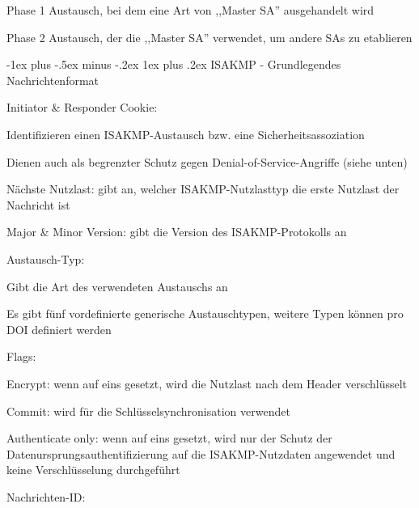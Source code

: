 \documentclass[a4paper]{article}
\makeatletter
\renewcommand{\subsubsection}{\@startsection{subsubsection}{3}{0mm}%
 {-1ex plus -.5ex minus -.2ex}%
 {1ex plus .2ex}%
 {\normalfont\small\bfseries}}
\makeatother
\begin{document}
\begin{multicols}{3}
\begin{itemize*}
            \begin{itemize*}
                  \item Phase 1 Austausch, bei dem eine Art von ,,Master SA'' ausgehandelt wird
                  \item Phase 2 Austausch, der die ,,Master SA'' verwendet, um andere SAs zu etablieren
            \end{itemize*}
      \end{itemize*}


      \subsubsection{ISAKMP - Grundlegendes
            Nachrichtenformat}

      \begin{itemize*}
            \item
            \item
            Initiator \& Responder Cookie:

            \begin{itemize*}
                  \item Identifizieren einen ISAKMP-Austausch bzw. eine Sicherheitsassoziation
                  \item Dienen auch als begrenzter Schutz gegen Denial-of-Service-Angriffe (siehe unten)
            \end{itemize*}
            \item
            Nächste Nutzlast: gibt an, welcher ISAKMP-Nutzlasttyp die erste
            Nutzlast der Nachricht ist
            \item
            Major \& Minor Version: gibt die Version des ISAKMP-Protokolls an
            \item
            Austausch-Typ:

            \begin{itemize*}
                  \item Gibt die Art des verwendeten Austauschs an
                  \item Es gibt fünf vordefinierte generische Austauschtypen, weitere Typen können pro DOI definiert werden
            \end{itemize*}
            \item
            Flags:

            \begin{itemize*}
                  \item Encrypt: wenn auf eins gesetzt, wird die Nutzlast nach dem Header verschlüsselt
                  \item Commit: wird für die Schlüsselsynchronisation verwendet
                  \item Authenticate only: wenn auf eins gesetzt, wird nur der Schutz der Datenursprungsauthentifizierung auf die ISAKMP-Nutzdaten angewendet und keine Verschlüsselung durchgeführt
            \end{itemize*}
            \item
            Nachrichten-ID:


\end{itemize*}
\end{multicols}
\end{document}
